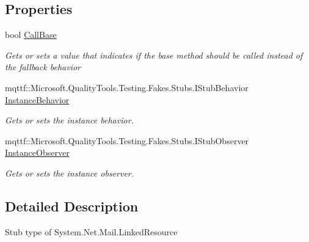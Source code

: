 \subsection*{Properties}
\begin{DoxyCompactItemize}
\item 
bool \hyperlink{class_system_1_1_net_1_1_mail_1_1_fakes_1_1_stub_linked_resource_aeb0ed903d4552f32b3823c1ee8f1cabb}{Call\-Base}
\begin{DoxyCompactList}\small\item\em Gets or sets a value that indicates if the base method should be called instead of the fallback behavior\end{DoxyCompactList}\item 
mqttf\-::\-Microsoft.\-Quality\-Tools.\-Testing.\-Fakes.\-Stubs.\-I\-Stub\-Behavior \hyperlink{class_system_1_1_net_1_1_mail_1_1_fakes_1_1_stub_linked_resource_a354d5fbf6c9832b393acfa2c274cf31d}{Instance\-Behavior}
\begin{DoxyCompactList}\small\item\em Gets or sets the instance behavior.\end{DoxyCompactList}\item 
mqttf\-::\-Microsoft.\-Quality\-Tools.\-Testing.\-Fakes.\-Stubs.\-I\-Stub\-Observer \hyperlink{class_system_1_1_net_1_1_mail_1_1_fakes_1_1_stub_linked_resource_a9a1ea7386ecfd79f1eab20cd5634114e}{Instance\-Observer}
\begin{DoxyCompactList}\small\item\em Gets or sets the instance observer.\end{DoxyCompactList}\end{DoxyCompactItemize}


\subsection{Detailed Description}
Stub type of System.\-Net.\-Mail.\-Linked\-Resource



